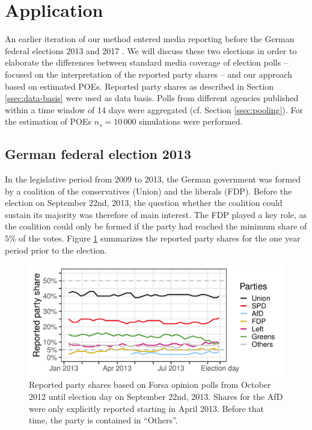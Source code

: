 \documentclass[smallextended]{svjour3}      %
\begin{document}
 
\section{Application} \label{sec:application}
An earlier iteration of our method entered media reporting before the German
federal elections 2013 and 2017 \citep[cf.][]{wahlistik_2013, gelitz_2017}.
We will discuss these two elections in order to elaborate the differences between
standard media coverage of election polls -- focused on the interpretation of the
reported party shares -- and our approach based on estimated POEs. Reported party
shares as described in Section \ref{ssec:data-basis} were used as data basis.
Polls from different agencies published within a time window of 14 days were
aggregated (cf. Section \ref{ssec:pooling}). For the estimation of POEs
$n_{s} = 10\,000$ simulations were performed.


\subsection{German federal election 2013} \label{subsec:2013}
In the legislative period from 2009 to 2013, the German government was formed by
a coalition of the conservatives (Union) and the liberals (FDP). Before the
election on September 22nd, 2013, the question whether the coalition could
sustain its majority was therefore of main interest. The FDP played a key role,
as the coalition could only be formed if the party had reached the minimum share
of $5\%$ of the votes. Figure \ref{fig:2013} summarizes the reported party shares
for the one year period prior to the election.

\begin{figure}[H]\centering
\includegraphics[width=.8\textwidth]{figures/2013_forsa_rawShares.pdf}
\caption{Reported party shares based on Forsa opinion polls
from October 2012 until election day on September 22nd, 2013.
Shares for the AfD were only explicitly reported starting in April 2013.
Before that time, the party is contained in ``Others''.
\label{fig:2013}
}
\end{figure}
\end{document}
